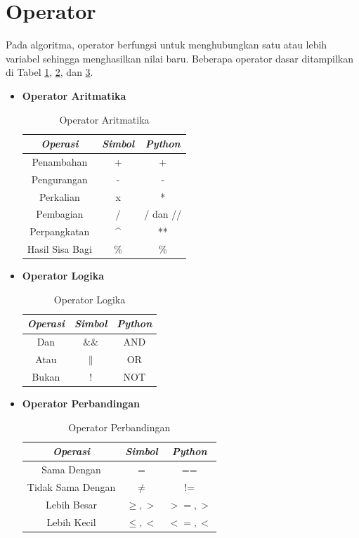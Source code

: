 \section{Operator}
Pada algoritma, operator berfungsi untuk menghubungkan satu atau lebih variabel sehingga menghasilkan nilai baru. Beberapa operator dasar ditampilkan di Tabel \ref{tbl:operatorAritmatika}, \ref{tbl:operatorLogika}, dan \ref{tbl:operatorPerbandingan}.

\FloatBarrier
\begin{itemize}

	\item \textbf{Operator Aritmatika}
			\large
			\begin{table}
				\centering
				\begin{tabular}[h!]{| c | c | c |}
				\hline	
				\textit{Operasi} & \textit{Simbol} & \textit{Python} \\ \hline
				Penambahan & + & + \\ \hline
				Pengurangan & - & - \\ \hline
				Perkalian & x & * \\ \hline
				Pembagian & / & / dan // \\ \hline
				Perpangkatan & \^{}  & ** \\ \hline
				Hasil Sisa Bagi & \% & \% \\
				\hline
				\end{tabular}
				\caption{Operator Aritmatika}
				\label{tbl:operatorAritmatika}
		\end{table}
	\FloatBarrier
	\item \textbf{Operator Logika}
			\large
			\begin{table}
				\centering
				\begin{tabular}[h!]{| c | c | c |}
				\hline	
				\textit{Operasi} & \textit{Simbol} & \textit{Python} \\ \hline
				Dan & $\&\&$ & AND \\ \hline
				Atau & $\|$ & OR \\ \hline
				Bukan & $!$ & NOT \\ 
				\hline
				\end{tabular}
				\caption{Operator Logika}
				\label{tbl:operatorLogika}
		\end{table}

\FloatBarrier	
	\item \textbf{Operator Perbandingan}
			\large
			\begin{table}
				\centering
				\begin{tabular}[h!]{| c | c | c |}
				\hline	
				\textit{Operasi} & \textit{Simbol} & \textit{Python} \\ \hline
				Sama Dengan & $=$ & == \\ \hline
				Tidak Sama Dengan & $\neq$ & != \\ \hline
				Lebih Besar & $\geq,>$ & $>=,>$ \\ \hline
				Lebih Kecil & $\leq,<$ & $<=,<$ \\
				\hline
				\end{tabular}
				\caption{Operator Perbandingan}
				\label{tbl:operatorPerbandingan}
		\end{table}
\end{itemize}

